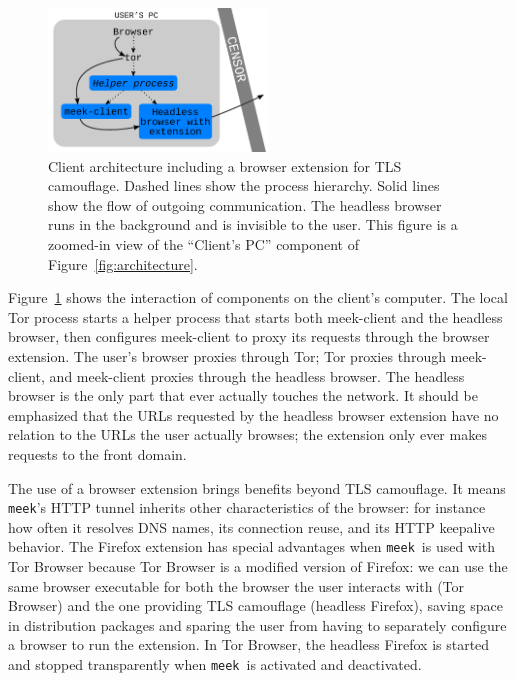 \documentclass[conference]{IEEEtran}
\newcommand{\meekclient}{\mbox{meek-client}\xspace}
\newcommand{\meek}{\texttt{meek}\xspace}
\begin{document}
\begin{figure}
\centering
\includegraphics[height=1.5in]{browser-architecture}
\caption{
Client architecture including a browser extension for TLS camouflage.
Dashed lines show the process hierarchy.
Solid lines show the flow of outgoing communication.
The headless browser runs in the background and is invisible to the user.
This figure is a zoomed-in view of the ``Client's PC'' component of Figure~\ref{fig:architecture}.
}
\label{fig:browser-architecture}
\end{figure}

Figure~\ref{fig:browser-architecture} shows the interaction of components
on the client's computer.
The local Tor process starts a helper process that starts both \meekclient
and the headless browser,
then configures \meekclient to proxy its requests through the browser extension.
The user's browser proxies through Tor;
Tor proxies through \meekclient,
and \meekclient proxies through the headless browser.
The headless browser is the only part that ever actually touches the network.
It should be emphasized that the URLs requested by the headless browser extension
have no relation to the URLs the user actually browses;
the extension only ever makes requests to the front domain.

The use of a browser extension brings benefits beyond TLS camouflage.
It means \meek's HTTP tunnel inherits other characteristics of the browser:
for instance
how often it resolves DNS names,
its connection reuse,
and its HTTP keepalive behavior.
The Firefox extension has special advantages
when \meek\ is used with Tor Browser
because Tor Browser
is a modified version of Firefox:
we can use the same browser executable for both the browser the user interacts with (Tor Browser)
and the one providing TLS camouflage (headless Firefox),
saving space in distribution packages
and sparing the user from having to separately configure a browser to run the extension.
In Tor Browser,
the headless Firefox is started and stopped transparently
when \meek\ is activated and deactivated.

\end{document}
